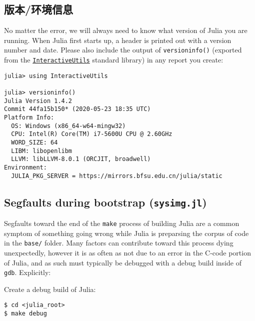 \hypertarget{13046485394122703550}{}


\subsection{版本/环境信息}



No matter the error, we will always need to know what version of Julia you are running. When Julia first starts up, a header is printed out with a version number and date. Please also include the output of \texttt{versioninfo()} (exported from the \hyperlink{11698106121547091928}{\texttt{InteractiveUtils}} standard library) in any report you create:




\begin{verbatim}
julia> using InteractiveUtils

julia> versioninfo()
Julia Version 1.4.2
Commit 44fa15b150* (2020-05-23 18:35 UTC)
Platform Info:
  OS: Windows (x86_64-w64-mingw32)
  CPU: Intel(R) Core(TM) i7-5600U CPU @ 2.60GHz
  WORD_SIZE: 64
  LIBM: libopenlibm
  LLVM: libLLVM-8.0.1 (ORCJIT, broadwell)
Environment:
  JULIA_PKG_SERVER = https://mirrors.bfsu.edu.cn/julia/static
\end{verbatim}



\hypertarget{3553581061539675492}{}


\subsection{Segfaults during bootstrap (\texttt{sysimg.jl})}



Segfaults toward the end of the \texttt{make} process of building Julia are a common symptom of something going wrong while Julia is preparsing the corpus of code in the \texttt{base/} folder.  Many factors can contribute toward this process dying unexpectedly, however it is as often as not due to an error in the C-code portion of Julia, and as such must typically be debugged with a debug build inside of \texttt{gdb}.  Explicitly:



Create a debug build of Julia:




\begin{lstlisting}
$ cd <julia_root>
$ make debug
\end{lstlisting}



